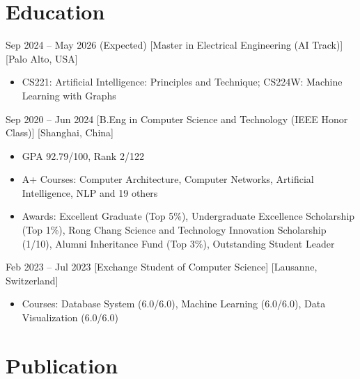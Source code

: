 \documentclass{chicv}
\begin{document}
\begin{basicinfo}
\end{basicinfo}

\section{Education}
{Sep 2024 -- May 2026 (Expected)}
[Master in Electrical Engineering (AI Track)]
[Palo Alto, USA]
\begin{itemize}
	\item CS221: Artificial Intelligence: Principles and Technique; CS224W: Machine Learning with Graphs
\end{itemize}

{Sep 2020 -- Jun 2024}
[B.Eng in Computer Science and Technology (IEEE Honor Class)]
[Shanghai, China]
\begin{itemize}
	\item GPA 92.79/100, Rank 2/122
	\item A+ Courses: Computer Architecture, Computer Networks, Artificial Intelligence, NLP and 19 others
	\item Awards: Excellent Graduate (Top 5\%), Undergraduate Excellence Scholarship (Top 1\%), Rong Chang Science and Technology Innovation Scholarship (1/10), Alumni Inheritance Fund (Top 3\%), Outstanding Student Leader
\end{itemize}

  {Feb 2023 -- Jul 2023}
  [Exchange Student of Computer Science]
  [Lausanne, Switzerland]
  \begin{itemize}
  	\item Courses: Database System (6.0/6.0), Machine Learning (6.0/6.0), Data Visualization (6.0/6.0)
  \end{itemize}

\section{Publication}
\end{document}
